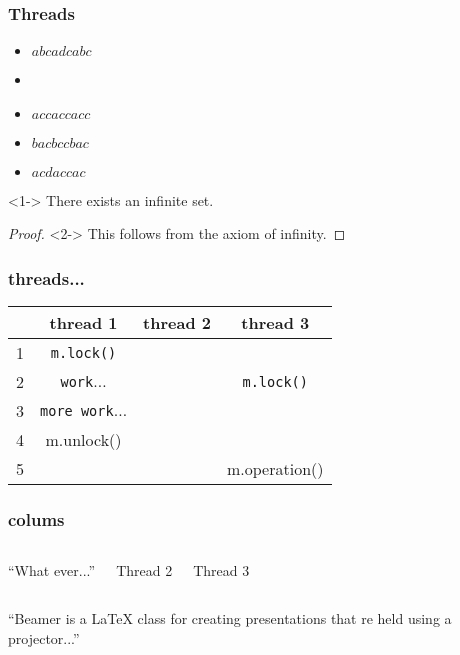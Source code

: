 \documentclass{beamer}
\begin{document}
\begin{frame}
  \frametitle{Threads}
  \begin{itemize}[<+->]
  \item<1> $abcadcabc$
  \item<1-2> 
  \item<1-2> $accaccacc$
  \item<1> $bacbccbac$
  \item<1,3> $acdaccac$
  \end{itemize}
\end{frame}

\begin{frame}
  \begin{theorem}<1->
    There exists an infinite set.
  \end{theorem}

  \begin{proof}<2->
    This follows from the axiom of infinity.
  \end{proof}
\end{frame}

\begin{frame}[fragile]
  \frametitle{threads...}
  \begin{center}
    \begin{tabular}{l|c|c|c}
      &thread 1 & thread 2 & thread 3\\
      \hline
      1&\verb|m.lock()| & &\\
      \hline
      2&\verb|work|$\ldots$& & \verb|m.lock()|\\
      \hline
      3&\verb|more work|$\ldots$&&\\
      \hline
      4&m.unlock() &&\\
      \hline
      5&&&m.operation()
    \end{tabular}
  \end{center}
\end{frame}

\begin{frame}
  \frametitle{colums}
  \begin{columns}[t]
    \begin{block}{}
      ``What ever...''
    \end{block}
    Thread 2

    Thread 3
  \end{columns}
\end{frame}


\begin{frame}
  \begin{block}{}
    ``Beamer is a {\LaTeX} class for creating presentations that re held
    using a projector...''
  \end{block}
\end{frame}
\end{document}
